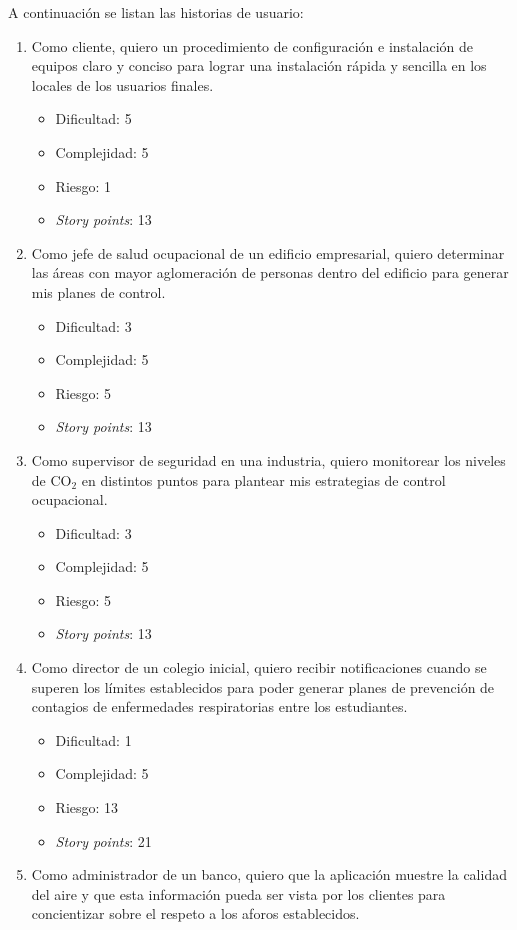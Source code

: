 \documentclass[
11pt, %
]{charter}
\begin{document}
A continuación se listan las historias de usuario:
\begin{enumerate}
	\item Como cliente, quiero un procedimiento de configuración e instalación de equipos claro y conciso para lograr una instalación rápida y sencilla en los locales de los usuarios finales.
	\begin{itemize}
 		\item Dificultad: 5
 		\item Complejidad: 5
	 	\item Riesgo: 1
	 	\item \textit{Story points}: 13
 	\end{itemize} 
	\item Como jefe de salud ocupacional de un edificio empresarial, quiero determinar las áreas con mayor aglomeración de personas dentro del edificio para generar mis planes de control.
	\begin{itemize}
 		\item Dificultad: 3
 		\item Complejidad: 5
	 	\item Riesgo: 5
	 	\item \textit{Story points}: 13
 	\end{itemize} 
	\item Como supervisor de seguridad en una industria, quiero monitorear los niveles de  CO$_{2}$ en distintos puntos para plantear mis estrategias de control ocupacional.
	\begin{itemize}
 		\item Dificultad: 3
 		\item Complejidad: 5
	 	\item Riesgo: 5
	 	\item \textit{Story points}: 13
 	\end{itemize} 
	\item Como director de un colegio inicial, quiero recibir notificaciones cuando se superen los límites establecidos para poder generar planes de prevención de contagios de enfermedades respiratorias entre los estudiantes.
	\begin{itemize}
 		\item Dificultad: 1
 		\item Complejidad: 5
	 	\item Riesgo: 13
	 	\item \textit{Story points}: 21
 	\end{itemize} 
 	\item Como administrador de un banco, quiero que la aplicación muestre la calidad del aire y que esta información pueda ser vista por los clientes para concientizar sobre el respeto a los aforos establecidos.

\end{enumerate}
\end{document}
